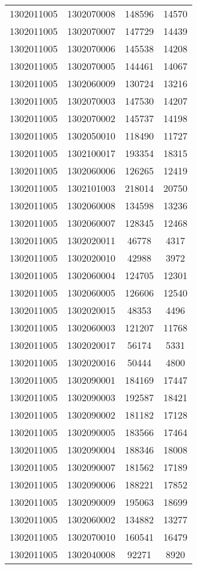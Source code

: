 \begin{longtable}{llcc}
1302011005 & 1302070008 & 148596 & 14570\\
1302011005 & 1302070007 & 147729 & 14439\\
1302011005 & 1302070006 & 145538 & 14208\\
1302011005 & 1302070005 & 144461 & 14067\\
1302011005 & 1302060009 & 130724 & 13216\\
1302011005 & 1302070003 & 147530 & 14207\\
1302011005 & 1302070002 & 145737 & 14198\\
1302011005 & 1302050010 & 118490 & 11727\\
1302011005 & 1302100017 & 193354 & 18315\\
1302011005 & 1302060006 & 126265 & 12419\\
1302011005 & 1302101003 & 218014 & 20750\\
1302011005 & 1302060008 & 134598 & 13236\\
1302011005 & 1302060007 & 128345 & 12468\\
1302011005 & 1302020011 & 46778 & 4317\\
1302011005 & 1302020010 & 42988 & 3972\\
1302011005 & 1302060004 & 124705 & 12301\\
1302011005 & 1302060005 & 126606 & 12540\\
1302011005 & 1302020015 & 48353 & 4496\\
1302011005 & 1302060003 & 121207 & 11768\\
1302011005 & 1302020017 & 56174 & 5331\\
1302011005 & 1302020016 & 50444 & 4800\\
1302011005 & 1302090001 & 184169 & 17447\\
1302011005 & 1302090003 & 192587 & 18421\\
1302011005 & 1302090002 & 181182 & 17128\\
1302011005 & 1302090005 & 183566 & 17464\\
1302011005 & 1302090004 & 188346 & 18008\\
1302011005 & 1302090007 & 181562 & 17189\\
1302011005 & 1302090006 & 188221 & 17852\\
1302011005 & 1302090009 & 195063 & 18699\\
1302011005 & 1302060002 & 134882 & 13277\\
1302011005 & 1302070010 & 160541 & 16479\\
1302011005 & 1302040008 & 92271 & 8920\\

\end{longtable}
